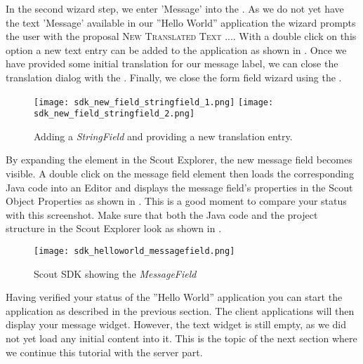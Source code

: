 In the second wizard step, we enter 'Message' into the .
As we do not yet have the text 'Message' available in our ''Hello World'' application the wizard prompts the user with the proposal \textsc{New Translated Text ...}.
With a double click on this option a new text entry can be added to the application as shown in .
Once we have provided some initial translation for our message label, we can close the translation dialog with the .
Finally, we close the form field wizard using the .

\begin{figure}
\texttt{[image: sdk\_new\_field\_stringfield\_1.png]} \hspace{8mm}
\texttt{[image: sdk\_new\_field\_stringfield\_2.png]}
\caption{Adding a \textit{StringField} and providing a new translation entry.}
\end{figure}

By expanding the  element in the Scout Explorer, the new message field becomes visible. 
A double click on the message field element then loads the corresponding Java code into an Editor and displays the message field's properties in the Scout Object Properties as shown in .
This is a good moment to compare your status with this screenshot.
Make sure that both the Java code and the project structure in the Scout Explorer look as shown in . 

\begin{figure}
\texttt{[image: sdk\_helloworld\_messagefield.png]}
\caption{Scout SDK showing the \it{MessageField}}
\end{figure}

Having verified your status of the ''Hello World'' application you can start the application as described in the previous section.
The client applications will then display your message widget.
However, the text widget is still empty, as we did not yet load any initial content into it.
This is the topic of the next section where we continue this tutorial with the server part.

